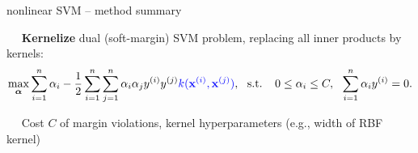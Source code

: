 
\begin{frame}{nonlinear SVM -- method summary}

\footnotesize

 ~~ \textbf{Kernelize} dual (soft-margin) SVM problem, 
replacing all inner products by kernels:
$$\max_{\alphav} \sumin \alpha_i - \frac{1}{2}\sumin \sumjn
\alpha_i\alpha_j\yi y^{(j)} \textcolor{blue}{k(\xi, \xi[j])}, ~~ \text{s.t. } ~~ 
0 \le \alpha_i \le C, ~~ \sumin \alpha_i \yi = 0.
$$

\medskip

 ~~ Cost $C$ of margin violations, kernel 
hyperparameters (e.g., width of RBF kernel)

\medskip

\begin{columns}[T, totalwidth=\textwidth]
    \begin{column}{0.59\textwidth}
        

\end{column}
\end{columns}
\end{frame}
